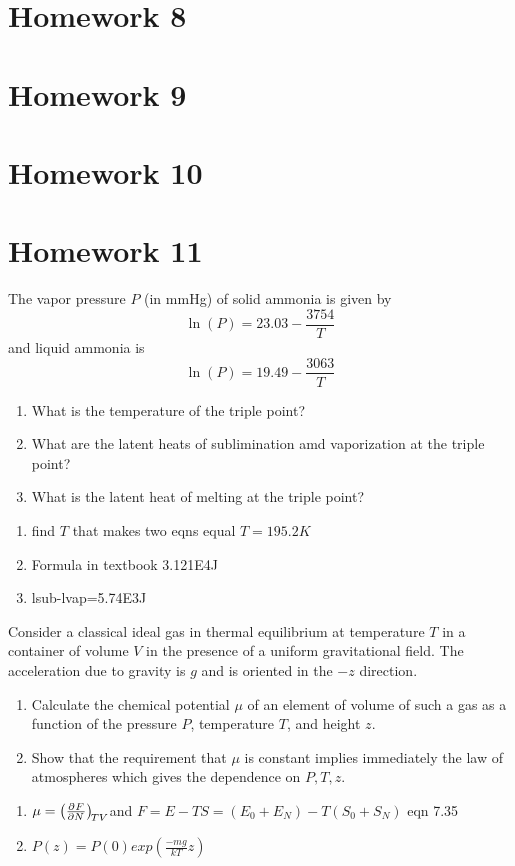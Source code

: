 \documentclass{article}
\begin{document}
\section{Homework 8}
\section{Homework 9}
\section{Homework 10}
\newpage
\section{Homework 11}
    \begin{problem}[Reif 8.2]
        The vapor pressure $P$ (in mmHg) of solid ammonia is given by 
        $$\ln(P)=23.03-\frac{3754}{T}$$ 
        and liquid ammonia is 
        $$\ln(P)=19.49-\frac{3063}{T}$$
        \begin{enumerate}[label=(\alph*)]
            \item What is the temperature of the triple point?
            \item What are the latent heats of sublimination amd vaporization at the triple point? 
            \item What is the latent heat of melting at the triple point?
        \end{enumerate} 
        \answerline
        \begin{enumerate}[label=\alph*)]
            \item find $T$ that makes two eqns equal $T=195.2K$
            \item Formula in textbook 3.121E4J
            \item lsub-lvap=5.74E3J
        \end{enumerate}
    \end{problem}\newpage
    \begin{problem}[Reif 8.11]
        Consider a classical ideal gas in thermal equilibrium at temperature $T$ in a container of volume $V$ in the presence of a uniform gravitational field. The acceleration due to gravity is $g$ and is oriented in the $-z$ direction. 
        \begin{enumerate}[label=(\alph*)]
            \item Calculate the chemical potential $\mu$ of an element of volume of such a gas as a function of the pressure $P$, temperature $T$, and height $z$.
            \item Show that the requirement that $\mu$ is constant implies immediately the law of atmospheres which gives the dependence on $P,T,z$.
        \end{enumerate}
        \answerline
        \begin{enumerate}[label=\alph*)]
            \item $\mu=\pder{F}{N}[TV]$ and $F=E-TS=(E_0+E_N)-T(S_0+S_N)$ eqn 7.35
            \item $P(z)=P(0)exp(\frac{-mg}{kT}z)$
        \end{enumerate}
    \end{problem}
    
\end{document}
